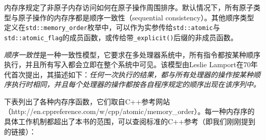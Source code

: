 
内存序规定了非原子内存访问如何在原子操作周围排序。默认情况下，所有原子类型与原子操作的内存序都是顺序一致性（sequential consistency）。其他顺序类型定义在\texttt{std::\allowbreak{}memory\_\allowbreak{}order}枚举中，可以作为实参传给\texttt{std::\allowbreak{}atomic}与\texttt{std::\allowbreak{}atomic\_\allowbreak{}flag}的成员函数，或传给带\texttt{\_\allowbreak{}explicit()}后缀的非成员函数。



\begin{myNote}
\textit{顺序一致性}是一种一致性模型，它要求在多处理器系统中，所有指令都按某种顺序执行，并且所有写入都会立即在整个系统中可见。该模型由Leslie Lamport在70年代首次提出，其描述如下：\textit{任何一次执行的结果，都与所有处理器的操作按某种顺序执行时相同，}\textit{并且每个处理器的操作都按各自程序规定的顺序}\textit{出现在该序列中。}
\end{myNote}



下表列出了各种内存序函数，它们取自C++参考网站（http://\allowbreak{}en.\allowbreak{}cppreference.\allowbreak{}com/\allowbreak{}w/\allowbreak{}cpp/\allowbreak{}atomic/\allowbreak{}memory\_\allowbreak{}order）。每一种内存序的具体工作机制都超出了本书的范围，可以查阅标准的C++参考（即我们刚刚提到的链接）：



